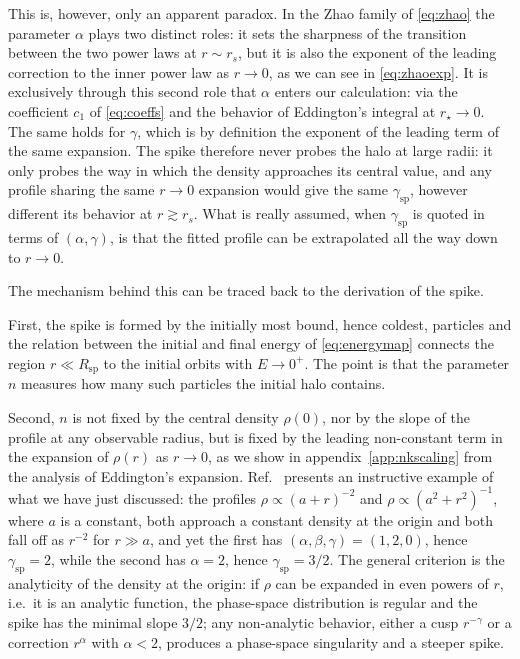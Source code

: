 This is, however, only an apparent paradox. In the Zhao family of \cref{eq:zhao} the
parameter $\alpha$ plays two distinct roles: it sets the sharpness of the transition
between the two power laws at $r \sim r_s$, but it is also the exponent of the
leading correction to the inner power law as $r \to 0$, as we can see in \cref{eq:zhaoexp}.
It is exclusively through this second role that $\alpha$ enters our calculation:
via the coefficient $c_1$ of \cref{eq:coeffs} and the
behavior of Eddington's integral at $r_\star \to 0$.
The same holds for $\gamma$, which is
by definition the exponent of the leading term of the same expansion.
The spike therefore never probes
the halo at large radii: it only probes the way in which the density approaches its
central value, and any profile sharing the same $r \to 0$ expansion would give the same
$\gamma_{\mathrm{sp}}$, however different its behavior at $r \gtrsim r_s$. What is really
assumed, when $\gamma_{\mathrm{sp}}$ is quoted in terms of $(\alpha,\gamma)$, is that the
fitted profile can be extrapolated all the way down to $r \to 0$.

The mechanism behind this can be traced back to the derivation of the spike.

First, the spike is formed by the initially most bound, hence coldest, particles 
and the relation between the initial and final energy of \cref{eq:energymap} 
connects the region $r \ll R_{\mathrm{sp}}$ to the initial
orbits with $E \to 0^{+}$. The point is that the parameter $n$ measures how
many such particles the initial halo contains.

Second, $n$ is not fixed by the central density $\rho(0)$, nor
by the slope of the profile at any observable radius, but is fixed by
the leading non-constant term in the expansion of $\rho(r)$ as $r \to 0$, 
as we show in appendix~\ref{app:nkscaling} from the analysis of Eddington's expansion.
Ref.~\cite{Ullio_2001} presents an instructive example of what we have just discussed:
the profiles
$\rho \propto (a+r)^{-2}$ and $\rho \propto (a^{2}+r^{2})^{-1}$, where $a$ is
a constant, both approach a constant density at the origin and both fall off as
$r^{-2}$ for $r \gg a$, and yet the first has
$(\alpha,\beta,\gamma) = (1,2,0)$, hence $\gamma_{\mathrm{sp}} = 2$, while the
second has $\alpha = 2$, hence $\gamma_{\mathrm{sp}} = 3/2$.
The general criterion \cite{Quinlan_1995} is the analyticity of the density at the origin:
if $\rho$ can be expanded in even powers of $r$, i.e.\ it is an analytic
function, the phase-space distribution is regular and the spike has the minimal slope $3/2$; any
non-analytic behavior, either a cusp $r^{-\gamma}$ or a correction
$r^{\alpha}$ with $\alpha < 2$, produces a phase-space singularity and a
steeper spike.



